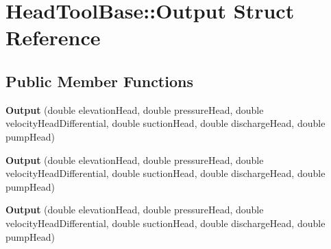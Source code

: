 \hypertarget{struct_head_tool_base_1_1_output}{}\section{Head\+Tool\+Base\+:\+:Output Struct Reference}
\label{struct_head_tool_base_1_1_output}
\subsection*{Public Member Functions}
\begin{DoxyCompactItemize}
\item 
\mbox{\label{struct_head_tool_base_1_1_output_a62b859b65f029c6bbc2734ecf7f7431e}} 
{\bfseries Output} (double elevation\+Head, double pressure\+Head, double velocity\+Head\+Differential, double suction\+Head, double discharge\+Head, double pump\+Head)
\item 
\mbox{\label{struct_head_tool_base_1_1_output_a62b859b65f029c6bbc2734ecf7f7431e}} 
{\bfseries Output} (double elevation\+Head, double pressure\+Head, double velocity\+Head\+Differential, double suction\+Head, double discharge\+Head, double pump\+Head)
\item 
\mbox{\label{struct_head_tool_base_1_1_output_a62b859b65f029c6bbc2734ecf7f7431e}} 
{\bfseries Output} (double elevation\+Head, double pressure\+Head, double velocity\+Head\+Differential, double suction\+Head, double discharge\+Head, double pump\+Head)
\end{DoxyCompactItemize}

